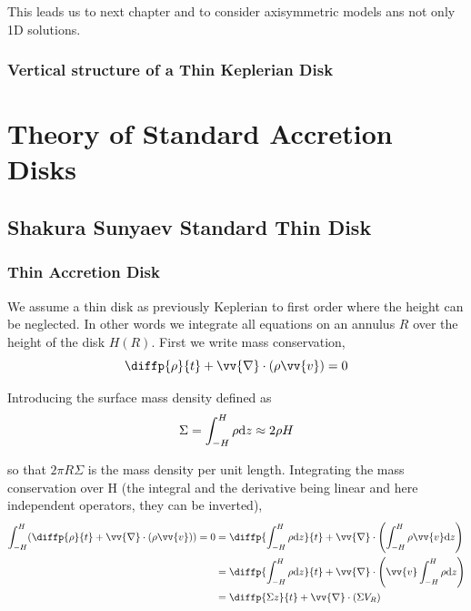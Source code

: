 \documentclass[10pt,a4paper,english]{article}
\let\originalleft\left
\let\originalright\right
\renewcommand{\left}{\mathopen{}\mathclose\bgroup\originalleft}
\renewcommand{\right}{\aftergroup\egroup\originalright}
\begin{document}
This leads us to next chapter and to consider axisymmetric models ans not only 1D solutions.

\subsubsection{Vertical structure of a Thin Keplerian Disk}

\section{Theory of Standard Accretion Disks}

\subsection{Shakura Sunyaev Standard Thin Disk}

\subsubsection{Thin Accretion Disk}


We assume a thin disk as previously Keplerian to first order where the height
can be neglected. In other words we integrate all equations on an annulus $R$
over the height of the disk $H(R)$. First we write mass conservation,
\begin{equation*}
    \diffp{\rho}{t} + \vv{\nabla}\cdot(\rho \vv{v}) = 0
\end{equation*}

Introducing the surface mass density defined as
\begin{equation*}
    \Sigma = \int_{-H}^H \rho \mathrm{d}{z} \approx 2 \rho H
\end{equation*}

so that $2 \pi R \Sigma$ is the mass density per unit length. Integrating the
mass conservation over H (the integral and the derivative being linear and here
independent operators, they can be inverted),
\begin{align*}
    \int_{-H}^H \left( \diffp{\rho}{t} + \vv{\nabla}\cdot(\rho \vv{v}) \right) = 0 %
    &= \diffp{\int_{-H}^H \rho \d{z}}{t} + \vv{\nabla}\cdot\left( \int_{-H}^H \rho \vv{v} \d{z} \right) \\
    &= \diffp{\int_{-H}^H \rho \d{z}}{t} + \vv{\nabla}\cdot\left( \vv{v} \int_{-H}^H \rho \d{z} \right) \\
    &= \diffp{\Sigma z}{t} + \vv{\nabla}\cdot(\Sigma V_R)
\end{align*}
\end{document}

